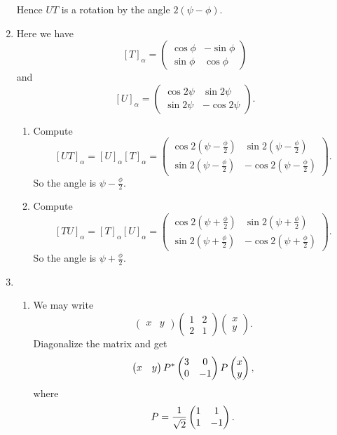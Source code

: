 \begin{enumerate}
Hence $UT$ is a rotation by the angle $2(\psi-\phi) $.
\item Here we have 
\[[T]_{\alpha}=\begin{pmatrix}\cos \phi &-\sin \phi \\\sin \phi &\cos \phi \end{pmatrix}\]
and 
\[[U]_{\alpha}=\begin{pmatrix}\cos 2\psi &\sin 2\psi \\\sin 2\psi &-\cos 2\psi \end{pmatrix}.\]
\begin{enumerate}
\item Compute 
\[[UT]_{\alpha}=[U]_{\alpha}[T]_{\alpha}=\begin{pmatrix}\cos 2(\psi-\frac{\phi}{2}) &\sin 2(\psi-\frac{\phi}{2}) \\\sin 2(\psi-\frac{\phi}{2}) &-\cos 2(\psi-\frac{\phi}{2}) \end{pmatrix}.\]
So the angle is $\psi-\frac{\phi}{2}$.
\item Compute 
\[[TU]_{\alpha}=[T]_{\alpha}[U]_{\alpha}=\begin{pmatrix}\cos 2(\psi+\frac{\phi}{2}) &\sin 2(\psi+\frac{\phi}{2}) \\\sin 2(\psi+\frac{\phi}{2}) &-\cos 2(\psi+\frac{\phi}{2}) \end{pmatrix}.\]
So the angle is $\psi+\frac{\phi}{2}$.
\end{enumerate}
\item \begin{enumerate}
\item We may write 
\[\begin{pmatrix}x&y\end{pmatrix}\begin{pmatrix}1&2\\2&1\end{pmatrix}\begin{pmatrix}x\\y\end{pmatrix}.\]
Diagonalize the matrix and get 
\[\begin{pmatrix}x&y\end{pmatrix}P^*\begin{pmatrix}3 & 0\cr 0 & -1\end{pmatrix}P\begin{pmatrix}x\\y\end{pmatrix},\]
where  
\[P=\frac{1}{\sqrt{2}}\begin{pmatrix}1 & 1\cr 1 & -1\end{pmatrix}.\]

\end{enumerate}
\end{enumerate}
